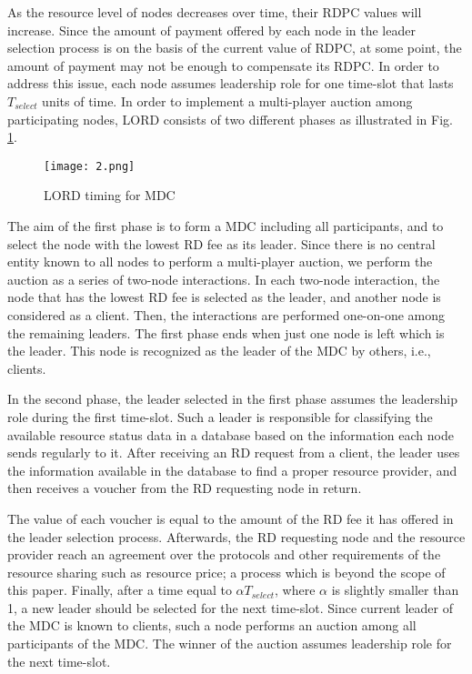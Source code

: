 \documentclass[journal,12pt, onecolumn]{IEEEtran}
\begin{document}
As the resource level of nodes decreases over time, their RDPC values will increase. Since the amount of payment offered by each node in the leader selection process is on the basis of the current value of RDPC, at some point, the amount of payment may not be enough to compensate its RDPC. In order to address this issue, each node assumes leadership role for one time-slot that lasts $T_{select}$ units of time.
In order to implement a multi-player auction among participating nodes, LORD consists of two different phases as illustrated in Fig. \ref{figure 5}. 



\begin{figure}[b]
\begin{center}
\texttt{[image: 2.png]}
\caption{LORD timing for MDC}
\label{figure 5}
\end{center}
\end{figure}

The aim of the first phase is to form a MDC including all participants, and to select the node with the lowest RD fee as its leader. Since there is no central entity known to all nodes to perform a multi-player auction, 
we perform the auction as a series of two-node interactions. In each two-node interaction, the node that has the lowest RD fee is selected as the leader, and another node is considered as a client. Then, the interactions are performed one-on-one among the remaining leaders. The first phase ends when just one node is left which is the leader. This node is recognized as the leader of the MDC by others, i.e., clients.

In the second phase, the leader selected in the first phase assumes the leadership role during the first time-slot. Such a leader is responsible for classifying the available resource status data in a database based on the information each node sends regularly to it. After receiving an RD request from a client, the leader uses the information available in the database to find a proper resource provider, and then receives a voucher from the RD requesting node in return. 

The value of each voucher is equal to the amount of the RD fee it has offered in the leader selection process. Afterwards, the RD requesting node and the resource provider reach an agreement over the protocols and other requirements of the resource sharing such as resource price; a process which is beyond the scope of this paper. Finally, after a time equal to $\alpha T_{select}$, where $\alpha$ is slightly smaller than 1, a new leader should be selected for the next time-slot. Since current leader of the MDC is known to clients, such a node performs an auction among all participants of the MDC. The winner of the auction assumes leadership role for the next time-slot.
\end{document}
